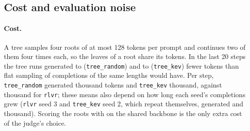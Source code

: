 \begin{table}[t]
\centering\small

\caption{Share of completions that repeat part of the solution after the first boxed answer (a line of at least 20
characters that already occurred before it): the training completions of each run in five 25-step windows, and the
final policy's greedy MATH-500 completions.}
\label{tab:tree-repeat}
\end{table}

\begin{table}[t]
\centering\small
\setlength{\tabcolsep}{4.5pt}

\caption{What each final policy writes on MATH-500 (greedy): completion tokens, share truncated at 2048 tokens, share of
lines (of at least 20 characters) that repeat an earlier line of the same completion, share of completions that repeat
such a line after their first boxed answer, share with more than one boxed answer (the verifier reads the last one),
share that open with an informal draft, and \kev{}'s $\pc$ for right and for wrong answers.}
\label{tab:tree-style}
\end{table}

\subsection{Cost and evaluation noise}\label{sec:res-tree-cost}

\paragraph{Cost.} A tree samples four roots of at most 128 tokens per prompt and continues two of them four times each,
so the leaves of a root share its tokens. In the last 20 steps the tree runs generated  to
 (\texttt{tree\_random}) and  to 
(\texttt{tree\_kev}) fewer tokens than flat sampling of completions of the same lengths would have. Per step,
\texttt{tree\_random} generated  thousand tokens and \texttt{tree\_kev} 
thousand, against  thousand for \texttt{rlvr}; these means also depend on how long each seed's
completions grew (\texttt{rlvr} seed 3 and \texttt{tree\_kev} seed 2, which
repeat themselves, generated  and  thousand). Scoring the roots with \kev{}
on the shared backbone is the only extra cost of the judge's choice.

